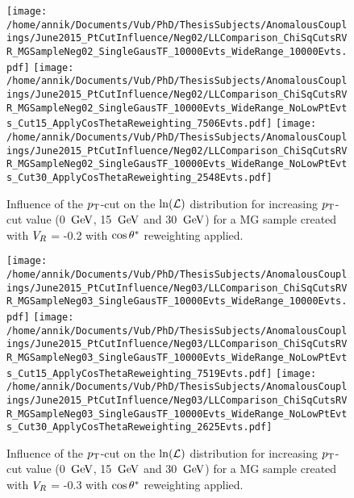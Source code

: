 \begin{figure}[h!t]
 \centering
 \texttt{[image: /home/annik/Documents/Vub/PhD/ThesisSubjects/AnomalousCouplings/June2015\_PtCutInfluence/Neg02/LLComparison\_ChiSqCutsRVR\_MGSampleNeg02\_SingleGausTF\_10000Evts\_WideRange\_10000Evts.pdf]}
 \texttt{[image: /home/annik/Documents/Vub/PhD/ThesisSubjects/AnomalousCouplings/June2015\_PtCutInfluence/Neg02/LLComparison\_ChiSqCutsRVR\_MGSampleNeg02\_SingleGausTF\_10000Evts\_WideRange\_NoLowPtEvts\_Cut15\_ApplyCosThetaReweighting\_7506Evts.pdf]}
 \texttt{[image: /home/annik/Documents/Vub/PhD/ThesisSubjects/AnomalousCouplings/June2015\_PtCutInfluence/Neg02/LLComparison\_ChiSqCutsRVR\_MGSampleNeg02\_SingleGausTF\_10000Evts\_WideRange\_NoLowPtEvts\_Cut30\_ApplyCosThetaReweighting\_2548Evts.pdf]}
 \caption{Influence of the $p_{\textrm T}$-cut on the $\ln(\mathcal{L})$ distribution for increasing $p_{\textrm T}$-cut value (0 $\, \mathrm{GeV}$, 15 $\, \mathrm{GeV}$ and 30 $\, \mathrm{GeV}$) for a MG sample created with $V_{R}$ = -0.2 with $\cos \theta^{*}$ reweighting applied.}
 \label{fig::CosThetaNeg02}
\end{figure}

\begin{figure}[h!t]
 \centering
 \texttt{[image: /home/annik/Documents/Vub/PhD/ThesisSubjects/AnomalousCouplings/June2015\_PtCutInfluence/Neg03/LLComparison\_ChiSqCutsRVR\_MGSampleNeg03\_SingleGausTF\_10000Evts\_WideRange\_10000Evts.pdf]}
 \texttt{[image: /home/annik/Documents/Vub/PhD/ThesisSubjects/AnomalousCouplings/June2015\_PtCutInfluence/Neg03/LLComparison\_ChiSqCutsRVR\_MGSampleNeg03\_SingleGausTF\_10000Evts\_WideRange\_NoLowPtEvts\_Cut15\_ApplyCosThetaReweighting\_7519Evts.pdf]}
 \texttt{[image: /home/annik/Documents/Vub/PhD/ThesisSubjects/AnomalousCouplings/June2015\_PtCutInfluence/Neg03/LLComparison\_ChiSqCutsRVR\_MGSampleNeg03\_SingleGausTF\_10000Evts\_WideRange\_NoLowPtEvts\_Cut30\_ApplyCosThetaReweighting\_2625Evts.pdf]}
 \caption{Influence of the $p_{\textrm T}$-cut on the $\ln(\mathcal{L})$ distribution for increasing $p_{\textrm T}$-cut value (0 $\, \mathrm{GeV}$, 15 $\, \mathrm{GeV}$ and 30 $\, \mathrm{GeV}$) for a MG sample created with $V_{R}$ = -0.3 with $\cos \theta^{*}$ reweighting applied.}
 \label{fig::CosThetaNeg03}
\end{figure}

